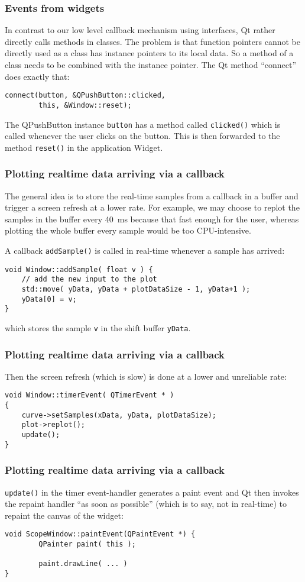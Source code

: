 \documentclass[xcolor=dvipsnames]{beamer}
\begin{document}
\begin{frame}[fragile]
\frametitle{Events from widgets}
In contrast to our low level callback mechanism using interfaces, Qt rather
directly calls methods in classes. The problem is that function pointers
cannot be directly used as a class has instance pointers to its local
data. So a method of a class needs to be combined with the instance
pointer. The Qt method ``connect'' does exactly that:
\begin{verbatim}
connect(button, &QPushButton::clicked,
        this, &Window::reset);
\end{verbatim}
The QPushButton instance \texttt{button} has a method called \texttt{clicked()} which is
called whenever the user clicks on the button. This is then forwarded to the
method \texttt{reset()} in the application Widget.
\end{frame}


\begin{frame}[fragile]
\frametitle{Plotting realtime data arriving via a callback}
The general idea is to store the real-time samples from a callback in a
buffer and trigger a screen refresh at a lower rate. For example, we may
choose to replot the samples in the buffer every
40~ms because that fast enough for the user, whereas plotting the
whole buffer every sample would be too CPU-intensive.

A callback \texttt{addSample()} is called in real-time whenever
a sample has arrived:
\begin{verbatim}
void Window::addSample( float v ) {
    // add the new input to the plot
    std::move( yData, yData + plotDataSize - 1, yData+1 );
    yData[0] = v;
}
\end{verbatim}
which stores the sample \texttt{v} in the shift buffer \texttt{yData}.
\end{frame}


\begin{frame}[fragile]
\frametitle{Plotting realtime data arriving via a callback}
Then the screen refresh (which is slow) is done at
a lower and unreliable rate:
\begin{verbatim}
void Window::timerEvent( QTimerEvent * )
{
    curve->setSamples(xData, yData, plotDataSize);
    plot->replot();
    update();
}
\end{verbatim}
\end{frame}


\begin{frame}[fragile]
\frametitle{Plotting realtime data arriving via a callback}
\texttt{update()} in the timer event-handler generates a
paint event and Qt then invokes the repaint
handler ``as soon as possible'' (which is to say, not in real-time) to repaint
the canvas of the widget:
\begin{verbatim}
void ScopeWindow::paintEvent(QPaintEvent *) {
        QPainter paint( this );

        paint.drawLine( ... )
}
\end{verbatim}
\end{frame}
\end{document}
